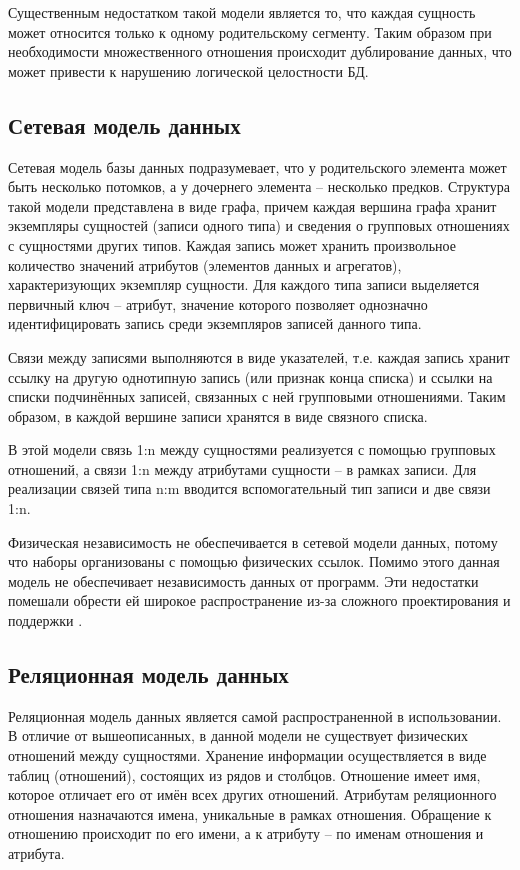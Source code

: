 Существенным недостатком такой модели является то, что каждая сущность может относится только к одному родительскому сегменту. Таким образом при необходимости множественного отношения происходит дублирование данных, что может привести к нарушению логической целостности БД\thinspace\cite{db}.

\subsection{Сетевая модель данных}

Сетевая модель базы данных подразумевает, что у родительского элемента может быть несколько потомков, а у дочернего элемента -- несколько предков. Структура такой модели представлена в виде графа, причем каждая вершина графа хранит экземпляры сущностей (записи одного типа) и сведения о групповых отношениях с сущностями других типов. Каждая запись может хранить произвольное количество значений атрибутов (элементов данных и агрегатов), характеризующих экземпляр сущности. Для каждого типа записи выделяется первичный ключ – атрибут, значение которого позволяет однозначно идентифицировать запись среди экземпляров записей данного типа.

Связи между записями выполняются в виде указателей, т.е. каждая запись хранит ссылку на другую однотипную запись (или признак конца списка) и ссылки на списки подчинённых записей, связанных с ней групповыми отношениями. Таким образом, в каждой вершине записи хранятся в виде связного списка.

В этой модели связь 1:n между сущностями реализуется с помощью групповых отношений, а связи 1:n между атрибутами сущности -- в рамках записи. Для реализации связей типа n:m вводится вспомогательный тип записи и две связи 1:n. 

Физическая независимость не обеспечивается в сетевой модели данных, потому что наборы организованы с помощью физических ссылок. Помимо этого данная модель не обеспечивает независимость данных от программ. Эти недостатки помешали обрести ей широкое распространение из-за сложного проектирования и поддержки \cite{db}.

\subsection{Реляционная модель данных}

Реляционная модель данных является самой распространенной в использовании. В отличие от вышеописанных, в данной модели не существует физических отношений между сущностями. Хранение информации осуществляется в виде таблиц (отношений), состоящих из рядов и столбцов. Отношение имеет имя, которое отличает его от имён всех других отношений. Атрибутам реляционного отношения назначаются имена, уникальные в рамках отношения. Обращение к отношению происходит по его имени, а к атрибуту – по именам отношения и атрибута.

